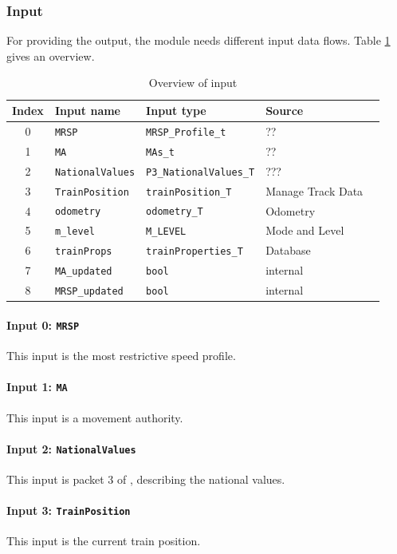 \subsubsection{Input}
For providing the output, the module needs different input data flows. Table \ref{tbl:speedsupervisionInput} gives an overview.

\begin{table}[H]
  \begin{tabular}{| c | l | l | l | l |}
    \hline
    \textbf{Index} & \textbf{Input name} & \textbf{Input type} & \textbf{Source}\\ \hline
    0 & \texttt{MRSP} & \texttt{MRSP\_Profile\_t} & ?? \\
    1 & \texttt{MA} & \texttt{MAs\_t} & ??\\
    2 & \texttt{NationalValues} & \texttt{P3\_NationalValues\_T} & ???\\
    3 & \texttt{TrainPosition} & \texttt{trainPosition\_T} & Manage Track Data\\
    4 & \texttt{odometry} & \texttt{odometry\_T} & Odometry\\
    5 & \texttt{m\_level} & \texttt{M\_LEVEL} & Mode and Level\\
    6 & \texttt{trainProps} & \texttt{trainProperties\_T} & Database\\
    7 & \texttt{MA\_updated} & \texttt{bool} & internal\\
	8 & \texttt{MRSP\_updated} & \texttt{bool} & internal\\
    \hline
  \end{tabular} 
  \caption{Overview of input}
  \label{tbl:speedsupervisionInput}
\end{table}

\paragraph{Input 0: \texttt{MRSP}}
This input is the most restrictive speed profile.
\paragraph{Input 1: \texttt{MA}}
This input is a movement authority.
\paragraph{Input 2: \texttt{NationalValues}}
This input is packet 3 of \cite[Chapt.~8]{subset-026}, describing the national values. 
\paragraph{Input 3: \texttt{TrainPosition}}
This input is the current train position.

